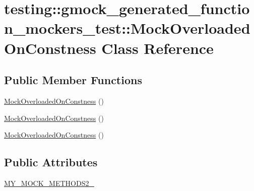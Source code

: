 \hypertarget{classtesting_1_1gmock__generated__function__mockers__test_1_1_mock_overloaded_on_constness}{}\section{testing\+::gmock\+\_\+generated\+\_\+function\+\_\+mockers\+\_\+test\+::Mock\+Overloaded\+On\+Constness Class Reference}
\label{classtesting_1_1gmock__generated__function__mockers__test_1_1_mock_overloaded_on_constness}
\subsection*{Public Member Functions}
\begin{DoxyCompactItemize}
\item 
\mbox{\hyperlink{classtesting_1_1gmock__generated__function__mockers__test_1_1_mock_overloaded_on_constness_a83e2840ed88fe4a01a878c3bb529d793}{Mock\+Overloaded\+On\+Constness}} ()
\item 
\mbox{\hyperlink{classtesting_1_1gmock__generated__function__mockers__test_1_1_mock_overloaded_on_constness_a83e2840ed88fe4a01a878c3bb529d793}{Mock\+Overloaded\+On\+Constness}} ()
\item 
\mbox{\hyperlink{classtesting_1_1gmock__generated__function__mockers__test_1_1_mock_overloaded_on_constness_a83e2840ed88fe4a01a878c3bb529d793}{Mock\+Overloaded\+On\+Constness}} ()
\end{DoxyCompactItemize}
\subsection*{Public Attributes}
\begin{DoxyCompactItemize}
\item 
\mbox{\hyperlink{classtesting_1_1gmock__generated__function__mockers__test_1_1_mock_overloaded_on_constness_a3447041442c4ca64d597186e894b307d}{M\+Y\+\_\+\+M\+O\+C\+K\+\_\+\+M\+E\+T\+H\+O\+D\+S2\+\_\+}}
\end{DoxyCompactItemize}
